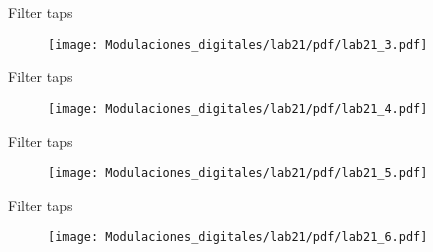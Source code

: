 
\begin{frame}{Filter taps}
\begin{figure}[H]
\centering
\vspace{-3mm}
\texttt{[image: Modulaciones\_digitales/lab21/pdf/lab21\_3.pdf]}
\end{figure}
\end{frame}

\begin{frame}{Filter taps}
\begin{figure}[H]
\centering
\vspace{-3mm}
\texttt{[image: Modulaciones\_digitales/lab21/pdf/lab21\_4.pdf]}
\end{figure}
\end{frame}


\begin{frame}{Filter taps}
\begin{figure}[H]
\centering
\vspace{-3mm}
\texttt{[image: Modulaciones\_digitales/lab21/pdf/lab21\_5.pdf]}
\end{figure}
\end{frame}


\begin{frame}{Filter taps}
\begin{figure}[H]
\centering
\vspace{-3mm}
\texttt{[image: Modulaciones\_digitales/lab21/pdf/lab21\_6.pdf]}
\end{figure}
\end{frame}




